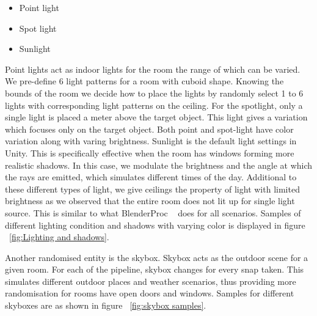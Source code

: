 \begin{itemize}
    \item Point light
    \item Spot light
    \item Sunlight
\end{itemize}

Point lights act as indoor lights for the room the range of which can be varied.
We pre-define 6 light patterns for a room with cuboid shape.
Knowing the bounds of the room we decide how to place the lights by randomly select 1 to 6 lights with corresponding light patterns on the ceiling.
For the spotlight, only a single light is placed a meter above the target object.
This light gives a variation which focuses only on the target object.
Both point and spot-light have color variation along with varing brightness.
Sunlight is the default light settings in Unity.
This is specifically effective when the room has windows forming more realistic shadows.
In this case, we modulate the brightness and the angle at which the rays are emitted, which simulates different times of the day.
Additional to these different types of light, we give ceilings the property of light with limited brightness as we observed that the entire room does not lit up for single light source.
This is similar to what BlenderProc ~\cite{denninger2019blenderproc} does for all scenarios.
Samples of different lighting condition and shadows with varying color is displayed in figure ~\ref{fig:Lighting and shadows}.

Another randomised entity is the skybox.
Skybox acts as the outdoor scene for a given room.
For each of the pipeline, skybox changes for every snap taken.
This simulates different outdoor places and weather scenarios, thus providing more randomisation for rooms have open doors and windows.
Samples for different skyboxes are as shown in figure ~\ref{fig:skybox samples}.


